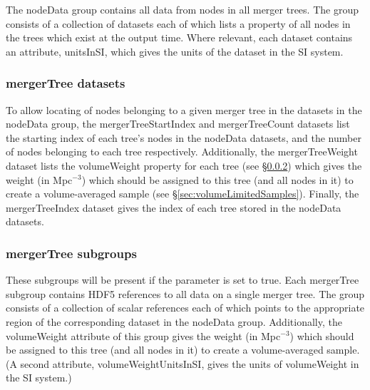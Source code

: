 The {\normalfont \ttfamily nodeData} group contains all data from nodes in all merger trees. The group consists of a collection of datasets each of which lists a property of all nodes in the trees which exist at the output time. Where relevant, each dataset contains an attribute, {\normalfont \ttfamily unitsInSI}, which gives the units of the dataset in the SI system.

\subsubsection{mergerTree datasets}\label{sec:mergerTreeDatasets}

To allow locating of nodes belonging to a given merger tree in the datasets in the {\normalfont \ttfamily nodeData} group, the {\normalfont \ttfamily mergerTreeStartIndex} and {\normalfont \ttfamily mergerTreeCount} datasets list the starting index of each tree's nodes in the {\normalfont \ttfamily nodeData} datasets, and the number of nodes belonging to each tree respectively. Additionally, the {\normalfont \ttfamily mergerTreeWeight} dataset lists the {\normalfont \ttfamily volumeWeight} property for each tree (see \S\ref{sec:mergerTreeSubgroups}) which gives the weight (in Mpc$^{-3}$) which should be assigned to this tree (and all nodes in it) to create a volume-averaged sample (see \S\ref{sec:volumeLimitedSamples}). Finally, the {\normalfont \ttfamily mergerTreeIndex} dataset gives the index of each tree stored in the {\normalfont \ttfamily nodeData} datasets.

\subsubsection{mergerTree subgroups}\label{sec:mergerTreeSubgroups}

These subgroups will be present if the {\normalfont \ttfamily [mergerTreeOutputReferences]} parameter is set to true. Each {\normalfont \ttfamily mergerTree} subgroup contains HDF5 references to all data on a single merger tree. The group consists of a collection of scalar references each of which points to the appropriate region of the corresponding dataset in the {\normalfont \ttfamily nodeData} group. Additionally, the {\normalfont \ttfamily volumeWeight} attribute of this group gives the weight (in Mpc$^{-3}$) which should be assigned to this tree (and all nodes in it) to create a volume-averaged sample. (A second attribute, {\normalfont \ttfamily volumeWeightUnitsInSI}, gives the units of {\normalfont \ttfamily volumeWeight} in the SI system.)

